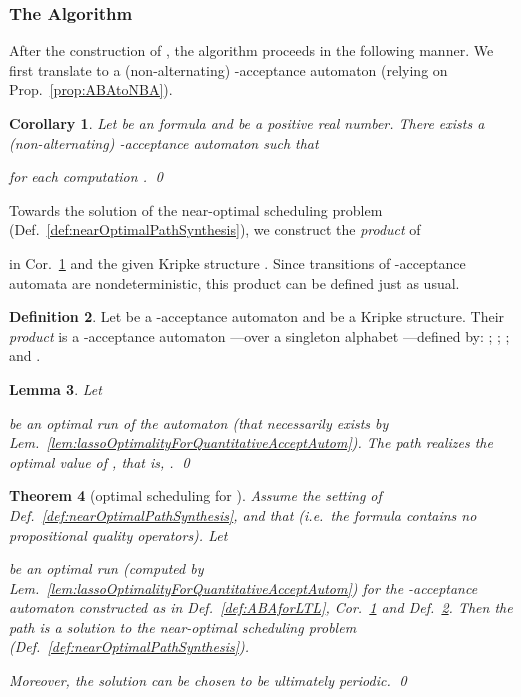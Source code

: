 \documentclass[a4paper,USenglish,numberwithinsect]{lipics}
\theoremstyle{definition}
\newtheorem{defi}{Definition}[section]
\theoremstyle{remark}
\theoremstyle{plain}
\newtheorem{cor}[defi]{Corollary}
\newtheorem{lem}[defi]{Lemma}
\newtheorem{thm}[defi]{Theorem}
\begin{document}
\subsubsection{The Algorithm}\label{subsubsec:theAlgorithmWithoutPropositional}
 After the construction of
 , 
the algorithm proceeds in the following manner.
We first translate  to a (non-alternating)
{}-acceptance automaton (relying on Prop.~\ref{prop:ABAtoNBA}).

\begin{cor}\label{cor:NBAforLTL}
  Let  be an   formula and  be a
 positive real number. There exists a (non-alternating) {}-acceptance automaton  such that 
  
for each computation .
\qed
\end{cor}


Towards the solution of the near-optimal 
scheduling problem (Def.~\ref{def:nearOptimalPathSynthesis}), we
construct the \emph{product} of

in
Cor.~\ref{cor:NBAforLTL}
and the given Kripke structure . Since transitions of
{}-acceptance automata are nondeterministic, this product can be
defined just as usual.
\begin{defi}\label{def:productAutomata}
  Let  be a
 {}-acceptance automaton and  be a Kripke
 structure.  Their \emph{product}  
is a 
 {}-acceptance automaton
 ---over a singleton alphabet
 ---defined by:
 ; ; ; and .
\end{defi}
\begin{lem}\label{lem:fromOptimalInATimesKToOptimalInA}
 Let 

be an optimal run of the automaton  (that necessarily
 exists by Lem.~\ref{lem:lassoOptimalityForQuantitativeAcceptAutom}).
The path  realizes the optimal
       value of , that is,
.
\qed
\end{lem}




\begin{thm}[optimal scheduling for ]\label{thm:mainWithoutPropositional}
 Assume the setting of  Def.~\ref{def:nearOptimalPathSynthesis}, 
 and that  (i.e.\ the formula  contains no
 propositional quality operators).
Let 

 be an optimal run (computed by
 Lem.~\ref{lem:lassoOptimalityForQuantitativeAcceptAutom}) for the
 -acceptance automaton 
 constructed as in Def.~\ref{def:ABAforLTL}, Cor.~\ref{cor:NBAforLTL}
 and Def.~\ref{def:productAutomata}. Then the path
  is a solution to the near-optimal scheduling problem (Def.~\ref{def:nearOptimalPathSynthesis}). 

Moreover,
 the solution   can be chosen to be ultimately
 periodic.
\qed
\end{thm}
\end{document}
